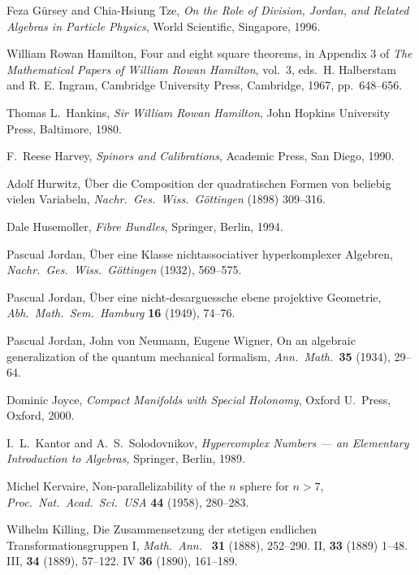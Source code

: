 \documentclass[12pt]{article}
\begin{document}
\begin{thebibliography}{10}
 Feza G\"ursey and Chia-Hsiung Tze, {\sl On the Role of Division, 
Jordan, and Related Algebras in Particle Physics}, World Scientific,   
Singapore, 1996.   
   
 William Rowan Hamilton, Four and eight square   
theorems, in Appendix 3 of {\sl The Mathematical Papers of William   
Rowan Hamilton}, vol.\ 3, eds.\ H. Halberstam and R. E. Ingram,   
Cambridge University Press, Cambridge, 1967, pp.\ 648--656.   
   
 Thomas L.\ Hankins, {\sl Sir William Rowan Hamilton},   
John Hopkins University Press, Baltimore, 1980.   
  
 F.\ Reese Harvey, {\sl Spinors and Calibrations},    
Academic Press, San Diego, 1990.   
  
 Adolf Hurwitz, \"Uber die Composition der quadratischen   
Formen von beliebig vielen Variabeln, {\sl Nachr.\ Ges.\ Wiss.\ G\"ottingen} 
(1898) 309--316.   

 Dale Husemoller, {\sl Fibre Bundles}, Springer, Berlin,
1994.

 Pascual Jordan, \"Uber eine Klasse nichtassociativer   
hyperkomplexer Algebren, {\sl Nachr.\ Ges.\ Wiss.\ G\"ottingen} (1932),  
569--575.   
  
 Pascual Jordan, \"Uber eine nicht-desarguessche 
ebene projektive Geometrie, {\sl Abh.\ Math.\ Sem.\ Hamburg} 
{\bf 16} (1949), 74--76. 
 
 Pascual Jordan, John von Neumann, Eugene Wigner,    
On an algebraic generalization of the quantum mechanical formalism,   
{\sl Ann.\ Math.\ }{\bf 35} (1934), 29--64.   
 
 Dominic Joyce, {\sl Compact Manifolds with Special  
Holonomy}, Oxford U.\ Press, Oxford, 2000.  
 
 I.\ L.\ Kantor and A.\ S.\ Solodovnikov, {\sl Hypercomplex   
Numbers --- an Elementary Introduction to Algebras,} Springer, Berlin, 1989.  

 Michel Kervaire, Non-parallelizability of the $n$ 
sphere for $n > 7$, {\sl Proc.\ Nat.\ Acad.\ Sci.\ USA} {\bf 44} (1958),
280--283.

 Wilhelm Killing, Die Zusammensetzung der stetigen
endlichen Transformationsgruppen I, {\sl Math.\ Ann.\ } {\bf 31} (1888),
252--290.  II, {\bf 33} (1889) 1--48.  III, {\bf 34} (1889), 57--122.
IV {\bf 36} (1890), 161--189.


\end{thebibliography}
\end{document}
